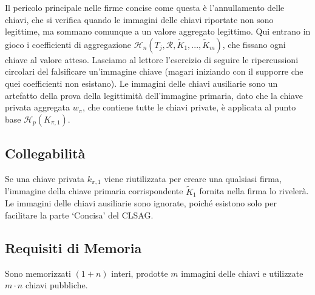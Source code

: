 Il pericolo principale nelle firme concise come questa è l'annullamento delle chiavi, che si verifica quando le immagini delle chiavi riportate non sono legittime, ma sommano comunque a un valore aggregato legittimo. Qui entrano in gioco i coefficienti di aggregazione \(\mathcal{H}_n(T_j, \mathcal{R}, \tilde{K}_1, ..., \tilde{K}_m)\), che fissano ogni chiave al valore atteso. Lasciamo al lettore l'esercizio di seguire le ripercussioni circolari del falsificare un'immagine chiave (magari iniziando con il supporre che quei coefficienti non esistano). Le immagini delle chiavi ausiliarie sono un artefatto della prova della legittimità dell'immagine primaria, dato che la chiave privata aggregata \(w_{\pi}\), che contiene tutte le chiavi private, è applicata al punto base \(\mathcal{H}_p(K_{\pi,1})\).


\subsection*{Collegabilità}

Se una chiave privata \(k_{\pi, 1}\) viene riutilizzata per creare una qualsiasi firma, l'immagine della chiave primaria corrispondente \(\tilde{K}_1\) fornita nella firma lo rivelerà. Le immagini delle chiavi ausiliarie sono ignorate, poiché esistono solo per facilitare la parte `Concisa' del CLSAG.


\subsection*{Requisiti di Memoria}

Sono memorizzati \((1 + n)\) interi, prodotte \(m\) immagini delle chiavi e utilizzate \(m \cdot n\) chiavi pubbliche.

